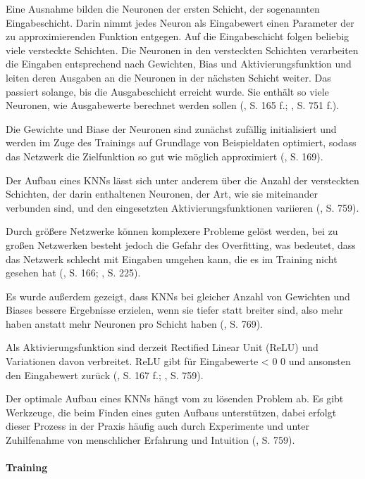 Eine Ausnahme bilden die Neuronen der ersten Schicht, der sogenannten Eingabeschicht. Darin nimmt jedes Neuron als Eingabewert einen Parameter der zu approximierenden Funktion entgegen. Auf die Eingabeschicht folgen beliebig viele versteckte Schichten. Die Neuronen in den versteckten Schichten verarbeiten die Eingaben entsprechend nach Gewichten, Bias und Aktivierungsfunktion und leiten deren Ausgaben an die Neuronen in der nächsten Schicht weiter. Das passiert solange, bis die Ausgabeschicht erreicht wurde. Sie enthält so viele Neuronen, wie Ausgabewerte berechnet werden sollen (\cite{Albrecht.2024}, S. 165 f.; \cite{Russell.2020}, S. 751 f.).

Die Gewichte und Biase der Neuronen sind zunächst zufällig initialisiert und werden im Zuge des Trainings auf Grundlage von Beispieldaten optimiert, sodass das Netzwerk die Zielfunktion so gut wie möglich approximiert (\cite{Albrecht.2024}, S. 169).


Der Aufbau eines KNNs lässt sich unter anderem über die Anzahl der versteckten Schichten, der darin enthaltenen Neuronen, der Art, wie sie miteinander verbunden sind, und den eingesetzten Aktivierungsfunktionen variieren (\cite{Russell.2020}, S. 759).

Durch größere Netzwerke können komplexere Probleme gelöst werden, bei zu großen Netzwerken besteht jedoch die Gefahr des Overfitting, was bedeutet, dass das Netzwerk schlecht mit Eingaben umgehen kann, die es im Training nicht gesehen hat (\cite{Albrecht.2024}, S. 166; \cite{Sutton.2018}, S. 225).

Es wurde außerdem gezeigt, dass KNNs bei gleicher Anzahl von Gewichten und Biases bessere Ergebnisse erzielen, wenn sie tiefer statt breiter sind, also mehr haben anstatt mehr Neuronen pro Schicht haben (\cite{Russell.2020}, S. 769).

Als Aktivierungsfunktion sind derzeit Rectified Linear Unit (ReLU) und Variationen davon verbreitet. ReLU gibt für Eingabewerte < 0 0 und ansonsten den Eingabewert zurück (\cite{Albrecht.2024}, S. 167 f.; \cite{Russell.2020}, S. 759).

Der optimale Aufbau eines KNNs hängt vom zu lösenden Problem ab. Es gibt Werkzeuge, die beim Finden eines guten Aufbaus unterstützen, dabei erfolgt dieser Prozess in der Praxis häufig auch durch Experimente und unter Zuhilfenahme von menschlicher Erfahrung und Intuition (\cite{Russell.2020}, S. 759).

\paragraph{Training}

